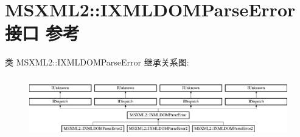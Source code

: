 \hypertarget{interface_m_s_x_m_l2_1_1_i_x_m_l_d_o_m_parse_error}{}\section{M\+S\+X\+M\+L2\+:\+:I\+X\+M\+L\+D\+O\+M\+Parse\+Error接口 参考}
\label{interface_m_s_x_m_l2_1_1_i_x_m_l_d_o_m_parse_error}
类 M\+S\+X\+M\+L2\+:\+:I\+X\+M\+L\+D\+O\+M\+Parse\+Error 继承关系图\+:\begin{figure}[H]
\begin{center}
\leavevmode
\includegraphics[height=2.679426cm]{interface_m_s_x_m_l2_1_1_i_x_m_l_d_o_m_parse_error}
\end{center}
\end{figure}
